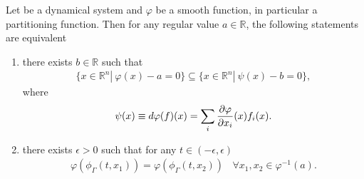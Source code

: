 \begin{proposition}\label{prop:prop2}
Let \dynSys be a dynamical system and $\varphi$ be a smooth function, in particular a partitioning function. Then for any regular value $a\in\mathds{R}$, the following statements are equivalent
\begin{enumerate}
\item there exists $b\in\mathds{R}$ such that \begin{align}
\{x\in\mathds{R}^{n}|~\varphi(x)-a=0\}\subseteq\{x\in\mathds{R}^{n}|~\psi(x)-b=0\},\label{eqn:subset_lev_set11}
\end{align}
where
\begin{align}
\notag\psi(x) \equiv d \varphi (f) (x) = \sum_{i}\frac{\partial\varphi}{\partial x_{i}}(x)f_{i}(x).
\end{align}
\item there exists $\epsilon>0$ such that for any $t\in(-\epsilon,\epsilon)$
\begin{align}
\varphi(\phi_{\Gamma}(t,x_{1}))=\varphi(\phi_{\Gamma}(t,x_{2}))~~~~\forall x_{1},x_{2}\in \varphi^{-1}(a).\label{eqn:new2}
\end{align}
\end{enumerate}
\end{proposition}

